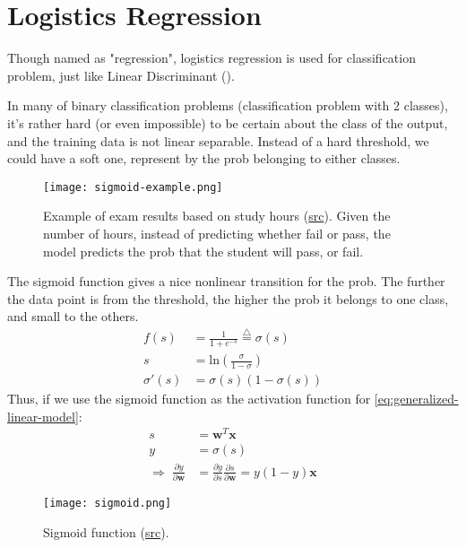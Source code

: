 \section{Logistics Regression}

Though named as "regression", logistics regression is used for classification problem, just like Linear Discriminant ().

 In many of binary classification problems (classification problem with 2 classes), it's rather hard (or even impossible) to be certain about the class of the output, and the training data is not linear separable. Instead of a hard threshold, we could have a soft one, represent by the \ac{prob} belonging to either classes.
\begin{figure}[hbt!]
	\centering
	\texttt{[image: sigmoid-example.png]}
	\caption{Example of exam results based on study hours (\href{https://machinelearningcoban.com/2017/01/27/logisticregression/}{src}). Given the number of hours, instead of predicting whether fail or pass, the model predicts the \ac{prob} that the student will pass, or fail.}
\end{figure}

The sigmoid function gives a nice nonlinear transition for the \ac{prob}. The further the data point is from the threshold, the higher the \ac{prob} it belongs to one class, and small to the others.
\begin{align}
	f(s) 		&= \frac{1}{1 + e^{-s}} \overset{\triangle}{=} \sigma(s) \\
	s 			&= \text{ln} \left( \frac{\sigma}{1-\sigma} \right) \\
	\sigma'(s)	&= \sigma(s) \left( 1- \sigma(s) \right)
\end{align}
Thus, if we use the sigmoid function as the activation function for \eqref{eq:generalized-linear-model}:
\begin{align}
	s &= \textbf{w}^T \textbf{x} \\
	y &= \sigma(s)\\
	\Rightarrow \; \frac{\partial y}{\partial \textbf{w}}&= \frac{\partial y}{\partial s} \frac{\partial s}{\partial \textbf{w}} = y(1-y) \textbf{x}
	\label{eq:sigmoid}
\end{align}
\begin{figure}[hbt!]
	\centering
	\texttt{[image: sigmoid.png]}
	\caption{Sigmoid function (\href{https://en.wikipedia.org/wiki/Sigmoid_function}{src}).}
\end{figure}


